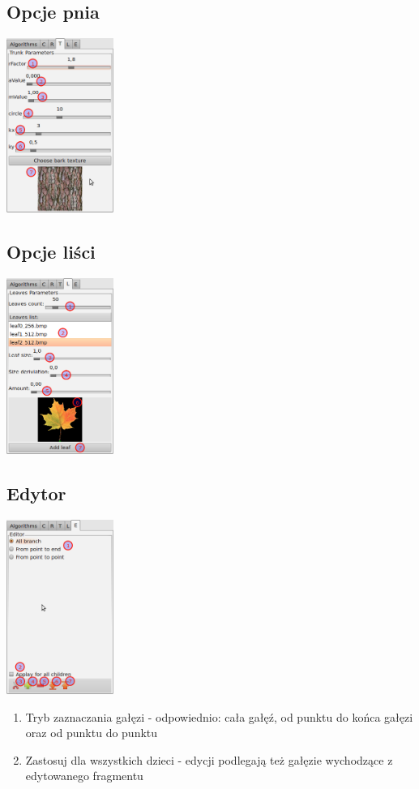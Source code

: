 \subsection{Opcje pnia}
\includegraphics[width=35mm]{images/gui/trunk_panel.png}


\subsection{Opcje liści}
\includegraphics[width=35mm]{images/gui/leaves_panel.png}


\subsection{Edytor}
\includegraphics[width=35mm]{images/gui/editor_panel.png}
\begin{enumerate}
	\item {Tryb zaznaczania gałęzi - odpowiednio: cała gałęź, od punktu do końca gałęzi oraz od punktu do punktu}
	\item {Zastosuj dla wszystkich dzieci - edycji podlegają też gałęzie wychodzące z edytowanego fragmentu}
\end{enumerate}

